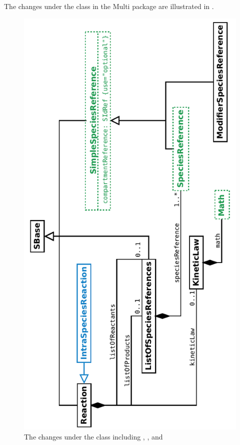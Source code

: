 The changes under the  class in the Multi package are illustrated in . 

\begin{figure}[htb]
  \begin{center}
\ifpdf
    \includegraphics[angle=-90, scale=0.7]{./figs/multi_010_Reaction.pdf}
\fi
    \caption{The changes under the \ExReaction class including \IntraSpeciesReaction, \ExSimpleSpeciesReference, \ExSpeciesReference and \ExMath}
  \label{fig:ExReaction}
  \end{center}
\end{figure}

